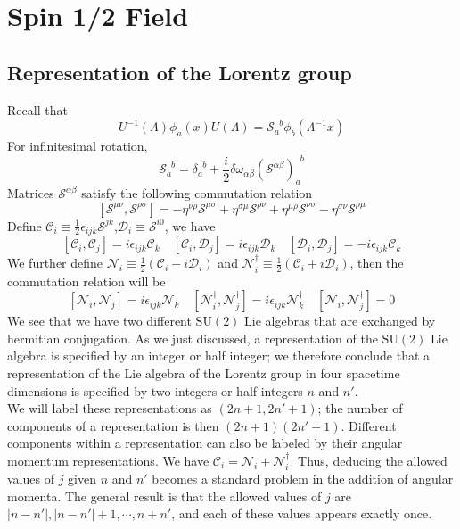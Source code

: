 \chapter{Spin 1/2 Field}
\section{Representation of the Lorentz group}
\noindent
Recall that
\[U^{-1}(\Lambda) \phi_a(x) U(\Lambda) = \mathscr{S}_{a}^{\phantom{a}b}\phi_b(\Lambda^{-1}x)\]
For infinitesimal rotation,
\[\mathscr{S}_{a}^{\phantom{a}b} = \delta_{a}^{\phantom{a}b}+\frac{i}{2} \delta \omega_{\alpha \beta} (\mathcal{S}^{\alpha \beta})_{a}^{\phantom{a}b} \]
Matrices $\mathcal{S}^{\alpha \beta}$ satisfy the following commutation relation
\[[\mathcal{S}^{\mu \nu},\mathcal{S}^{\rho \sigma}]= -\eta^{\nu \rho}\mathcal{S}^{\mu \sigma} + \eta^{\sigma \mu}\mathcal{S}^{\rho \nu} + \eta^{\mu \rho}\mathcal{S}^{\nu \sigma} - \eta^{\sigma \nu}\mathcal{S}^{\rho \mu}\]
Define $\mathcal{C}_i \equiv \frac{1}{2}\epsilon_{ijk}\mathcal{S}^{jk}$,$\mathcal{D}_i \equiv \mathcal{S}^{i0}$, we have
\[[\mathcal{C}_i,\mathcal{C}_j] = i\epsilon_{ijk}\mathcal{C}_k \quad [\mathcal{C}_i,\mathcal{D}_j] = i\epsilon_{ijk}\mathcal{D}_k \quad [\mathcal{D}_i,\mathcal{D}_j] = -i\epsilon_{ijk}\mathcal{C}_k\]
We further define $\mathcal{N}_i \equiv \frac{1}{2}(\mathcal{C}_i-i\mathcal{D}_i)$ and $\mathcal{N}^{\dagger}_i \equiv \frac{1}{2}(\mathcal{C}_i + i \mathcal{D}_i)$, then the commutation relation will be
\[[\mathcal{N}_i,\mathcal{N}_j] = i\epsilon_{ijk}\mathcal{N}_k \quad [\mathcal{N}^{\dagger}_i,\mathcal{N}^{\dagger}_j] = i\epsilon_{ijk}\mathcal{N}^{\dagger}_k \quad [\mathcal{N}_i,\mathcal{N}^{\dagger}_j] = 0\]
We see that we have two different $\mathrm{SU}(2)$ Lie algebras that are exchanged by hermitian conjugation. As we just discussed, a representation of the $\mathrm{SU}(2)$ Lie algebra is specified by an integer or half integer; we therefore conclude that a representation of the Lie algebra of the Lorentz group in four spacetime dimensions is specified by two integers or half-integers $n$ and $n'$.
\\
We will label these representations as $(2n+1, 2n'+1)$; the number of components of a representation is then $(2n+1)(2n'+1)$. Different components within a representation can also be labeled by their angular momentum representations. We have $\mathcal{C}_i = \mathcal{N}_i + \mathcal{N}^{\dagger}_i$. Thus, deducing the allowed values of $j$ given $n$ and $n'$ becomes a standard problem in the addition of angular momenta. The general result is that the allowed values of $j$ are $|n-n'|,|n-n'|+1,\cdots, n+n'$, and each of these values appears exactly once.

